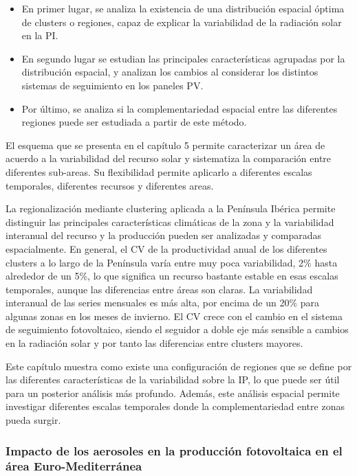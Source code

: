 \begin{itemize}
  
\item  En primer lugar, se analiza la existencia de una distribución espacial óptima de clusters o regiones, capaz de explicar la variabilidad de la radiación solar en la PI.
\item En segundo lugar se estudian las principales características agrupadas por la distribución espacial, y analizan los cambios al considerar los distintos sistemas de seguimiento en los paneles PV.
\item Por último, se analiza si la complementariedad espacial entre las diferentes regiones puede ser estudiada a partir de este método.

\end{itemize}

El esquema que se presenta en el capítulo 5 permite caracterizar un área de acuerdo a la variabilidad del recurso solar y sistematiza la comparación entre diferentes sub-areas. Su flexibilidad permite aplicarlo a diferentes escalas temporales, diferentes recursos y diferentes areas.

La regionalización mediante clustering aplicada a la Península Ibérica permite distinguir las principales características climáticas de la zona y la variabilidad interanual del recurso y la producción pueden ser analizadas y comparadas espacialmente. En general, el CV de la productividad anual de los diferentes clusters a lo largo de la Península varía entre muy poca variabilidad, 2$\%$ hasta alrededor de un 5$\%$, lo que significa un recurso bastante estable en esas escalas temporales, aunque las diferencias entre áreas son claras. La variabilidad interanual de las series mensuales es más alta, por encima de un 20$\%$ para algunas zonas en los meses de invierno. El CV crece con el cambio en el sistema de seguimiento fotovoltaico, siendo el seguidor a doble eje más sensible a cambios en la radiación solar y por tanto las diferencias entre clusters mayores.

Este capítulo muestra como existe una configuración de regiones que se define por las diferentes características de la variabilidad sobre la IP, lo que puede ser útil para un posterior análisis más profundo. Además, este análisis espacial permite investigar diferentes escalas temporales donde la complementariedad entre zonas pueda surgir.

\subsubsection{Impacto de los aerosoles en la producción fotovoltaica en el área Euro-Mediterránea}

